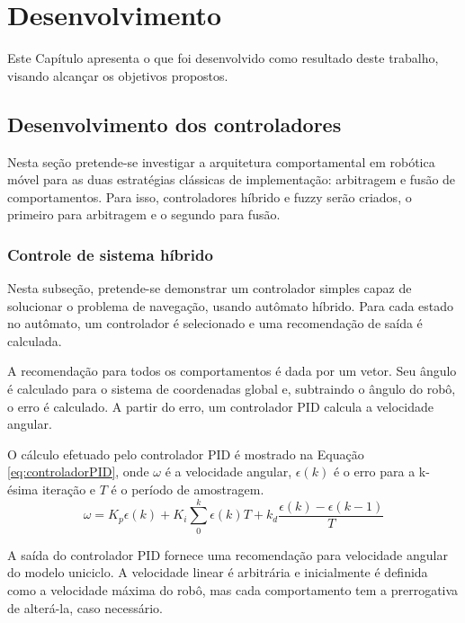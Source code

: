 \chapter{Desenvolvimento \label{CAP:DESENVOLVIMENTO}}
\vspace{-2.5 cm}

Este Capítulo apresenta o que foi desenvolvido como resultado deste trabalho,
visando alcançar os objetivos propostos.

\section{Desenvolvimento dos controladores}

	Nesta seção pretende-se investigar a arquitetura comportamental em robótica 
	móvel para as duas estratégias clássicas de implementação: arbitragem e fusão de 
	comportamentos. Para isso, controladores híbrido e fuzzy serão criados, o primeiro
	para arbitragem e o segundo para fusão.

	\subsection{Controle de sistema híbrido}
	
	Nesta subseção, pretende-se demonstrar um controlador simples capaz de 
	solucionar o problema de navegação, usando autômato híbrido. Para cada estado
	no autômato, um controlador é selecionado e uma recomendação de saída é 
	calculada. 
	
	A recomendação para todos os comportamentos é dada por um vetor. Seu ângulo é calculado 
	para  o sistema de coordenadas global e, subtraindo o ângulo do robô, o erro é calculado. 
	A partir do erro, um controlador PID calcula a velocidade angular. 
		
	O cálculo efetuado pelo controlador PID é mostrado na Equação \ref{eq:controladorPID},
	onde $\omega$ é a velocidade angular, $\epsilon(k)$ é o erro para a k-ésima iteração e 
	$T$ é o período de amostragem.
	\begin{equation}
		\label{eq:controladorPID}
		\omega = K_p \epsilon(k) + K_i \sum_0^k \epsilon(k) T + k_d \frac{\epsilon(k) - \epsilon(k-1)}{T}
	\end{equation}
	
	A saída do controlador PID fornece uma recomendação para velocidade angular do modelo uniciclo. 
	A velocidade linear é arbitrária e inicialmente é definida como a velocidade máxima 
	do robô, mas cada comportamento tem a prerrogativa de alterá-la, caso necessário.
	

